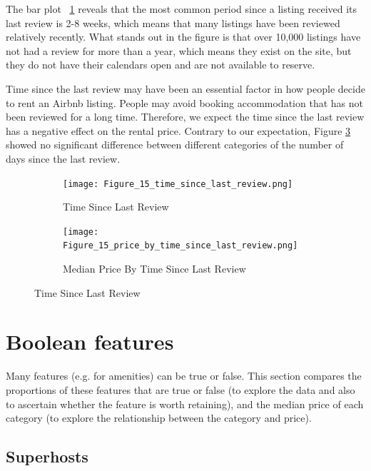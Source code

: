 The bar plot ~\ref{fig:time_since_last_review} reveals that the most
common period since a listing received its last review is 2-8 weeks, which means
that many listings have been reviewed relatively recently.  What stands out in
the figure is that over 10,000 listings have not had a review for more than a
year, which means they exist on the site, but they do not have their calendars
open and are not available to reserve.

Time since the last review may have been an essential factor in how people
decide to rent an Airbnb listing. People may avoid booking accommodation that
has not been reviewed for a long time. Therefore, we expect the time since the
last review has a negative effect on the rental price. Contrary to our
expectation, Figure \ref{fig:time_since_last_review_price} showed no significant
difference between different categories of the number of days since the last
review.

\begin{figure}[H]
    \centering
    \begin{subfigure}[b]{0.48\textwidth}
        \centering
        \texttt{[image: Figure\_15\_time\_since\_last\_review.png]}
        \caption{Time Since Last Review}
        \label{fig:time_since_last_review}
    \end{subfigure}
    \begin{subfigure}[b]{0.48\textwidth}
        \centering
        \texttt{[image: Figure\_15\_price\_by\_time\_since\_last\_review.png]}
        \caption{Median Price By Time Since Last Review}
        \label{fig:time_since_last_review_price}
    \end{subfigure}
    \caption{Time Since Last Review}
\end{figure}

\section{Boolean features}
\label{sec:boolean_features}

Many features (e.g. for amenities) can be true or false. This section compares
the proportions of these features that are true or false (to explore the data
and also to ascertain whether the feature is worth retaining), and the median
price of each category (to explore the relationship between the category and
price).

\subsection{Superhosts}

